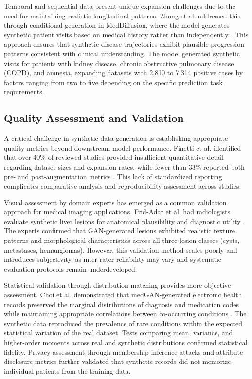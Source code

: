 Temporal and sequential data present unique expansion challenges due to the need for maintaining realistic longitudinal patterns. Zhong et al. addressed this through conditional generation in MedDiffusion, where the model generates synthetic patient visits based on medical history rather than independently \cite{zhong2024meddiffusion}. This approach ensures that synthetic disease trajectories exhibit plausible progression patterns consistent with clinical understanding. The model generated synthetic visits for patients with kidney disease, chronic obstructive pulmonary disease (COPD), and amnesia, expanding datasets with 2,810 to 7,314 positive cases by factors ranging from two to five depending on the specific prediction task requirements.

\subsection{Quality Assessment and Validation}

A critical challenge in synthetic data generation is establishing appropriate quality metrics beyond downstream model performance. Finetti et al. identified that over 40\% of reviewed studies provided insufficient quantitative detail regarding dataset sizes and expansion rates, while fewer than 33\% reported both pre- and post-augmentation metrics \cite{finetti2025data}. This lack of standardized reporting complicates comparative analysis and reproducibility assessment across studies.

Visual assessment by domain experts has emerged as a common validation approach for medical imaging applications. Frid-Adar et al. had radiologists evaluate synthetic liver lesions for anatomical plausibility and diagnostic utility \cite{fridadar2018gan}. The experts confirmed that GAN-generated lesions exhibited realistic texture patterns and morphological characteristics across all three lesion classes (cysts, metastases, hemangiomas). However, this validation method scales poorly and introduces subjectivity, as inter-rater reliability may vary and systematic evaluation protocols remain underdeveloped.

Statistical validation through distribution matching provides more objective assessment. Choi et al. demonstrated that medGAN-generated electronic health records preserved the marginal distributions of diagnosis and medication codes while maintaining appropriate correlations between co-occurring conditions \cite{choi2017generating}. The synthetic data reproduced the prevalence of rare conditions within the expected statistical variation of the real dataset. Tests comparing mean, variance, and higher-order moments across real and synthetic distributions confirmed statistical fidelity. Privacy assessment through membership inference attacks and attribute disclosure metrics further validated that synthetic records did not memorize individual patients from the training data.

